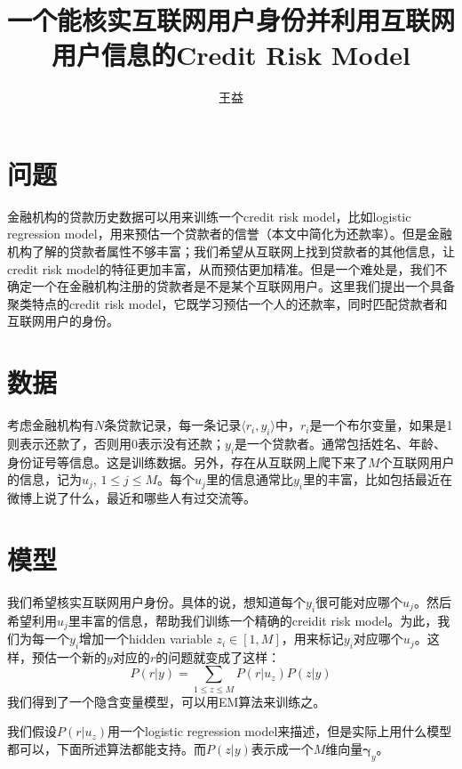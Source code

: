 \documentclass[12pt,a4paper]{article}
\newcommand{\V}{\boldsymbol}
\begin{document}
\title{一个能核实互联网用户身份并利用互联网用户信息的Credit Risk Model}
\author{王益}
\maketitle

\section{问题}

金融机构的贷款历史数据可以用来训练一个credit risk model，比如logistic regression model，用来预估一个贷款者的信誉（本文中简化为还款率）。但是金融机构了解的贷款者属性不够丰富；我们希望从互联网上找到贷款者的其他信息，让credit risk model的特征更加丰富，从而预估更加精准。但是一个难处是，我们不确定一个在金融机构注册的贷款者是不是某个互联网用户。这里我们提出一个具备聚类特点的credit risk model，它既学习预估一个人的还款率，同时匹配贷款者和互联网用户的身份。

\section{数据}

考虑金融机构有$N$条贷款记录，每一条记录$\langle r_i, y_i\rangle$中，$r_i$是一个布尔变量，如果是1则表示还款了，否则用0表示没有还款；$y_i$是一个贷款者。通常包括姓名、年龄、身份证号等信息。这是训练数据。另外，存在从互联网上爬下来了$M$个互联网用户的信息，记为${u_j}$, $1\leq j \leq M$。每个$u_j$里的信息通常比$y_i$里的丰富，比如包括最近在微博上说了什么，最近和哪些人有过交流等。

\section{模型}

我们希望核实互联网用户身份。具体的说，想知道每个$y_i$很可能对应哪个$u_j$。然后希望利用$u_j$里丰富的信息，帮助我们训练一个精确的creidit risk model。为此，我们为每一个$y_i$增加一个hidden variable $z_i\in[1,M]$，用来标记$y_i$对应哪个$u_j$。这样，预估一个新的$y$对应的$r$的问题就变成了这样：
%
\begin{equation}
\label{eq:model}
P(r|y) = \sum_{1\leq z\leq M} P(r|u_z) P(z|y)
\end{equation}
%
我们得到了一个隐含变量模型，可以用EM算法来训练之。

我们假设$P(r|u_z)$用一个logistic regression model来描述，但是实际上用什么模型都可以，下面所述算法都能支持。而$P(z|y)$表示成一个$M$维向量$\V\gamma_y$。
\end{document}
